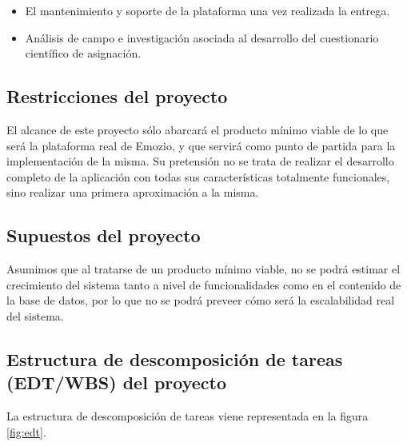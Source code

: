 \begin{itemize}
\item El mantenimiento y soporte de la plataforma una vez realizada la entrega.
\item Análisis de campo e investigación asociada al desarrollo del cuestionario científico de asignación.
\end{itemize}

\subsection{Restricciones del proyecto}
El alcance de este proyecto sólo abarcará el producto mínimo viable de lo que será la plataforma real de Emozio, y que servirá como punto de partida para la implementación de la misma. Su pretensión no se trata de realizar el desarrollo completo de la aplicación con todas sus características totalmente funcionales, sino realizar una primera aproximación a la misma.

\subsection{Supuestos del proyecto}
Asumimos que al tratarse de un producto mínimo viable, no se podrá estimar el crecimiento del sistema tanto a nivel de funcionalidades como en el contenido de la base de datos, por lo que no se podrá preveer cómo será la escalabilidad real del sistema.

\subsection{Estructura de descomposición de tareas (EDT/WBS) del proyecto}
La estructura de descomposición de tareas viene representada en la figura \ref{fig:edt}.


